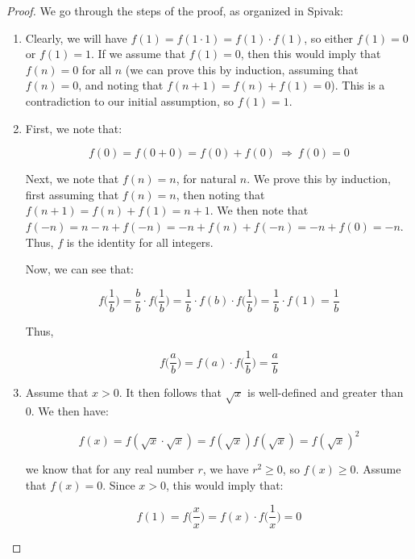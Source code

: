 \documentclass[10pt, oneside]{amsart}
\begin{document}
    \begin{proof}
      We go through the steps of the proof, as organized in Spivak:
      \newline

      \begin{enumerate}

      \item Clearly, we will have $f(1) = f(1 \cdot 1) = f(1) \cdot f(1)$, so either $f(1) = 0$ or $f(1) = 1$. If we assume that $f(1) = 0$,
        then this would imply that $f(n) = 0$ for all $n$ (we can prove this by induction, assuming that $f(n) = 0$, and noting that $f(n + 1) = f(n) + f(1) = 0$).
        This is a contradiction to our initial assumption, so $f(1) = 1$.
        \newline

      \item First, we note that:

        $$f(0) = f(0 + 0) = f(0) + f(0) \ \Rightarrow \ f(0) = 0$$
        \vspace{3pt}

        \noindent
        Next, we note that $f(n) = n$, for natural $n$. We prove this by induction, first assuming that $f(n) = n$, then noting that $f(n + 1) = f(n) + f(1) = n + 1$.
        We then note that $f(-n) = n - n + f(-n) = -n + f(n) + f(-n) = -n + f(0) = -n$. Thus, $f$ is the identity for all integers.
        \newline

        \noindent
        Now, we can see that:

        $$f\Big(\frac{1}{b}\Big) = \frac{b}{b} \cdot f\Big(\frac{1}{b}\Big) = \frac{1}{b} \cdot f(b) \cdot f\Big(\frac{1}{b}\Big) = \frac{1}{b} \cdot f(1) = \frac{1}{b}$$

        \noindent
        Thus,

        $$f\Big(\frac{a}{b}\Big) = f(a) \cdot f\Big( \frac{1}{b} \Big) = \frac{a}{b}$$

      \item Assume that $x > 0$. It then follows that $\sqrt{x}$ is well-defined and greater than $0$. We then have:

        $$f(x) = f(\sqrt{x} \cdot \sqrt{x}) = f(\sqrt{x}) f(\sqrt{x}) = f(\sqrt{x})^2$$

        \noindent
        we know that for any real number $r$, we have $r^2 \geq 0$, so $f(x) \geq 0$. Assume that $f(x) = 0$.
        Since $x > 0$, this would imply that:

        $$f(1) = f\Big( \frac{x}{x} \Big) = f(x) \cdot f\Big( \frac{1}{x} \Big) = 0$$


\end{enumerate}
\end{proof}
\end{document}
